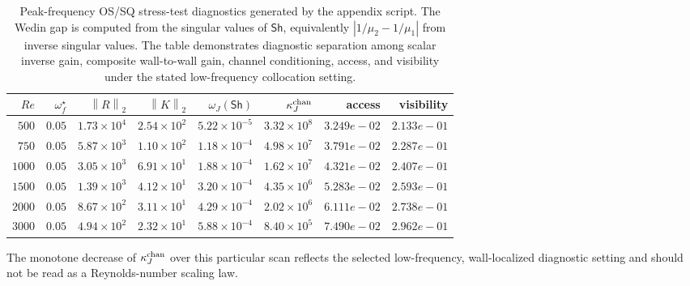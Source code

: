 \documentclass[review]{siamart220329}
\theoremstyle{definition}
\theoremstyle{remark}
\newcommand{\Sh}{\mathsf{Sh}}
\newcommand{\norm}[1]{\left\lVert #1\right\rVert}
\begin{document}
\begin{table}[ht]
\centering
\caption{Peak-frequency OS/SQ stress-test diagnostics generated by the appendix script. The Wedin gap is computed from the singular values of $\Sh$, equivalently $|1/\mu_2-1/\mu_1|$ from inverse singular values. The table demonstrates diagnostic separation among scalar inverse gain, composite wall-to-wall gain, channel conditioning, access, and visibility under the stated low-frequency collocation setting.}
\label{tab:orr-sommerfeld-re}
\begin{tabular}{@{}rrrrrrrr@{}}
\toprule
$Re$ & $\omega_f^\star$ & $\norm{R}_2$ & $\norm{K}_2$ & $\omega_J(\Sh)$ & $\kappa_J^{\rm chan}$ & access & visibility \\
\midrule
$500$ & $0.05$ & $1.73\times10^{4}$ & $2.54\times10^{2}$ & $5.22\times10^{-5}$ & $3.32\times10^{8}$ & $3.249e-02$ & $2.133e-01$ \\
$750$ & $0.05$ & $5.87\times10^{3}$ & $1.10\times10^{2}$ & $1.18\times10^{-4}$ & $4.98\times10^{7}$ & $3.791e-02$ & $2.287e-01$ \\
$1000$ & $0.05$ & $3.05\times10^{3}$ & $6.91\times10^{1}$ & $1.88\times10^{-4}$ & $1.62\times10^{7}$ & $4.321e-02$ & $2.407e-01$ \\
$1500$ & $0.05$ & $1.39\times10^{3}$ & $4.12\times10^{1}$ & $3.20\times10^{-4}$ & $4.35\times10^{6}$ & $5.283e-02$ & $2.593e-01$ \\
$2000$ & $0.05$ & $8.67\times10^{2}$ & $3.11\times10^{1}$ & $4.29\times10^{-4}$ & $2.02\times10^{6}$ & $6.111e-02$ & $2.738e-01$ \\
$3000$ & $0.05$ & $4.94\times10^{2}$ & $2.32\times10^{1}$ & $5.88\times10^{-4}$ & $8.40\times10^{5}$ & $7.490e-02$ & $2.962e-01$ \\
\bottomrule
\end{tabular}
\end{table}

The monotone decrease of $\kappa_J^{\rm chan}$ over this particular scan reflects the selected low-frequency, wall-localized diagnostic setting and should not be read as a Reynolds-number scaling law.
\end{document}
